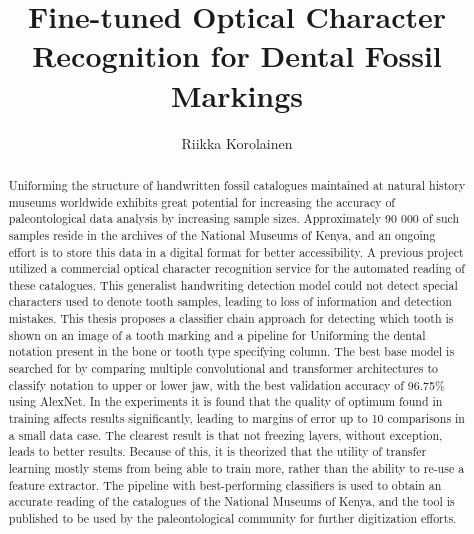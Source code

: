 \documentclass[english,twoside,openright]{UH_DS_MSc}
\title{Fine-tuned Optical Character Recognition for Dental Fossil Markings}
\author{Riikka Korolainen}
\date{\thesisdate}
\begin{document}
\maketitle


\begin{abstract}

Uniforming the structure of handwritten fossil catalogues maintained at natural history museums
worldwide exhibits great potential for increasing the accuracy of paleontological data analysis
by increasing sample sizes. Approximately 90 000 of such samples reside in the archives of the
National Museums of Kenya, and an ongoing effort is to store this data in a digital format for
better accessibility. A previous project utilized a commercial optical character recognition service
for the automated reading of these catalogues. This generalist handwriting detection model could not detect special characters used to denote tooth samples, leading to loss of information and
detection mistakes.
This thesis proposes a classifier chain approach for detecting which tooth is shown on an image of
a tooth marking and a pipeline for Uniforming the dental notation present in the bone or tooth
type specifying column. The best base model is searched for by comparing multiple convolutional
and transformer architectures to classify notation to upper or lower jaw, with the best validation
accuracy of 96.75\% using AlexNet. In the experiments it is found that the quality of optimum found
in training affects results significantly, leading to margins of error up to 10%
comparisons in a small data case. The clearest result is that not freezing layers, without exception,
leads to better results. Because of this, it is theorized that the utility of transfer learning mostly
stems from being able to train more, rather than the ability to re-use a feature extractor. The
pipeline with best-performing classifiers is used to obtain an accurate reading of the catalogues
of the National Museums of Kenya, and the tool is published to be used by the paleontological
community for further digitization efforts.

\end{abstract}
\end{document}
